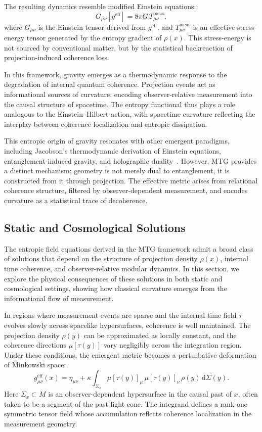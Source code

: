 \documentclass[11pt]{article}
\begin{document}
The resulting dynamics resemble modified Einstein equations:
\begin{equation}
G_{\mu\nu}[g^{\mathrm{eff}}] = 8\pi G \, T^{\mathrm{meas}}_{\mu\nu},
\end{equation}
where \( G_{\mu\nu} \) is the Einstein tensor derived from \( g^{\mathrm{eff}} \), and \( T^{\mathrm{meas}}_{\mu\nu} \) is an effective stress-energy tensor generated by the entropy gradient of \( \rho(x) \). This stress-energy is not sourced by conventional matter, but by the statistical backreaction of projection-induced coherence loss.

In this framework, gravity emerges as a thermodynamic response to the degradation of internal quantum coherence. Projection events act as informational sources of curvature, encoding observer-relative measurement into the causal structure of spacetime. The entropy functional thus plays a role analogous to the Einstein--Hilbert action, with spacetime curvature reflecting the interplay between coherence localization and entropic dissipation.

This entropic origin of gravity resonates with other emergent paradigms, including Jacobson's thermodynamic derivation of Einstein equations, entanglement-induced gravity, and holographic duality~\cite{jacobson1995thermodynamics, van2010building}. However, MTG provides a distinct mechanism; geometry is not merely dual to entanglement, it is constructed from it through projection. The effective metric arises from relational coherence structure, filtered by observer-dependent measurement, and encodes curvature as a statistical trace of decoherence.
\subsection{Static and Cosmological Solutions}
The entropic field equations derived in the MTG framework admit a broad class of solutions that depend on the structure of projection density \( \rho(x) \), internal time coherence, and observer-relative modular dynamics. In this section, we explore the physical consequences of these solutions in both static and cosmological settings, showing how classical curvature emerges from the informational flow of measurement.

In regions where measurement events are sparse and the internal time field \( \tau \) evolves slowly across spacelike hypersurfaces, coherence is well maintained. The projection density \( \rho(y) \) can be approximated as locally constant, and the coherence directions \( \mu[\tau(y)] \) vary negligibly across the integration region. Under these conditions, the emergent metric becomes a perturbative deformation of Minkowski space:
\begin{equation}
g^{\mathrm{eff}}_{\mu\nu}(x) = \eta_{\mu\nu} + \kappa \int_{\Sigma_x} \mu[\tau(y)]_\mu \, \mu[\tau(y)]_\nu \, \rho(y) \, \mathrm{d}\Sigma(y). \tag{125}
\end{equation}
Here \( \Sigma_x \subset M \) is an observer-dependent hypersurface in the causal past of \( x \), often taken to be a segment of the past light cone. The integrand defines a rank-one symmetric tensor field whose accumulation reflects coherence localization in the measurement geometry.
\end{document}
